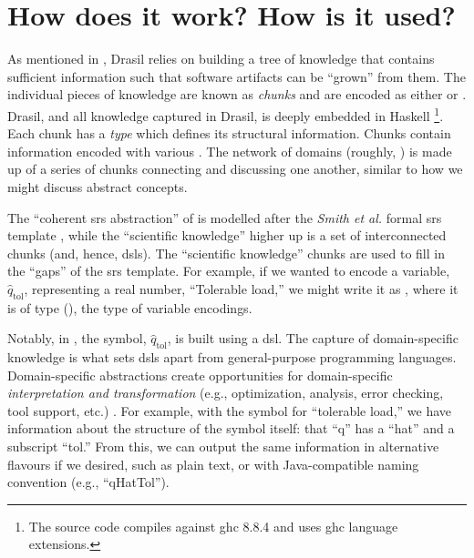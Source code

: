 \section{How does it work? How is it used?}
\label{chap:drasil:sec:how-does-it-work-how-is-it-used}

As mentioned in , Drasil relies
on building a tree of knowledge that contains sufficient information such that
software artifacts can be ``grown'' from them. The individual pieces of
knowledge are known as \textit{chunks} and are encoded as either  or
. Drasil, and all knowledge captured in Drasil, is deeply embedded in
Haskell \cite{Haskell2010} \footnote{The source code
      compiles against \acs{ghc} 8.8.4 \cite{GHC884} and uses \acs{ghc} language
      extensions.}. Each chunk has a \textit{type} which defines its structural
information. Chunks contain information encoded with various . The
network of domains (roughly, ) is made up of a series
of chunks connecting and discussing one another, similar to how we might discuss
abstract concepts.

The ``coherent \acs{srs} abstraction'' of  is
modelled after the \textit{Smith et al.} formal \acs{srs} template
\cite{SmithAndLai2005}, while the ``scientific knowledge'' higher up is a set of
interconnected chunks (and, hence, \acsp{dsl}). The ``scientific knowledge''
chunks are used to fill in the ``gaps'' of the \acs{srs} template. For example,
if we wanted to encode a variable, \(\hat{q}_{\text{tol}}\), representing a real
number, ``Tolerable load,'' we might write it as
, where it is of type \QuantityDict{}
(), the type of variable encodings.

\originalQuantityDictExampleHaskell{}

\originalQuantityDictHaskell{}

Notably, in , the symbol,
\(\hat{q}_{\text{tol}}\), is built using a \Symbol{} \acs{dsl}. The capture of
domain-specific knowledge is what sets \acsp{dsl} apart from general-purpose
programming languages. Domain-specific abstractions create opportunities for
domain-specific \textit{interpretation and transformation} (e.g., optimization,
analysis, error checking, tool support, etc.) \cite{Czarnecki2005}. For example,
with the symbol for ``tolerable load,'' we have information about the structure
of the symbol itself: that ``q'' has a ``hat'' and a subscript ``tol.'' From
this, we can output the same information in alternative flavours if we desired,
such as plain text, or with Java-compatible naming convention (e.g.,
``qHatTol'').

